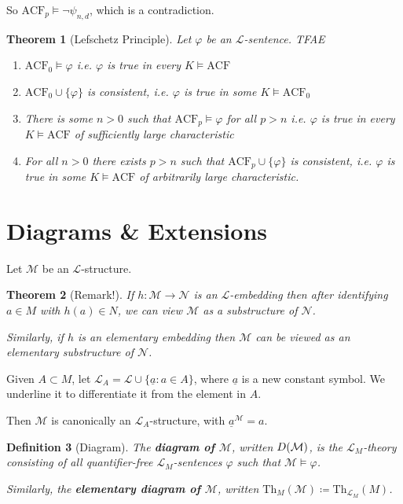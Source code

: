 \documentclass[]{article}
\theoremstyle{custhm}
\newtheorem{theorem}{Theorem}[section]
\theoremstyle{cusdef}
\newtheorem{defin}[theorem]{Definition}
\theoremstyle{custhm}
\theoremstyle{custhm}
\theoremstyle{custhm}
\theoremstyle{ex}
\theoremstyle{custhm}
\theoremstyle{cusdef}
\theoremstyle{remark}
\theoremstyle{remark}
\newcommand{\ra}{\rightarrow}
\newcommand{\undf}[1]{\textit{\textbf{#1}}}
\renewcommand{\L}{\mathcal{L}}
\renewcommand{\it}[1]{\textit{#1}}
\newcommand{\M}{\mathcal{M}}
\renewcommand{\phi}{\varphi}
\newcommand{\Th}{\textrm{Th}}
\newcommand{\N}{\mathcal{N}}
\newcommand{\acf}{\textrm{ACF}}
\newcommand{\D}{\mathcal{D}}
\begin{document}
So $\acf_p\models \neg\psi_{n,d}$, which is a contradiction.
\begin{theorem}[Lefschetz Principle]
Let $\phi$ be an $\L$-sentence. TFAE
\begin{enumerate}[label=(\arabic*)]
	\item $\acf_0\models \phi$ {\it i.e.} $\phi$ is true in every $K\models \acf$
	\item $\acf_0\cup\{\phi\}$ is consistent, {\it i.e.} $\phi$ is true in some $K\models \acf_0$
	\item There is some $n > 0$ such that $\acf_p\models\phi$ for all $p > n$ {\it i.e.} $\phi$ is true in every $K\models \acf$ of sufficiently large characteristic
	\item For all $n > 0$ there exists $p > n$ such that $\acf_p\cup\{\phi\}$ is consistent, {\it i.e.} $\phi$ is true in some $K\models \acf$ of arbitrarily large characteristic.
\end{enumerate}
\end{theorem}


\section{Diagrams \& Extensions}

Let $\M$ be an $\L$-structure.

\begin{theorem}[Remark!]
If $h:\M\ra\N$ is an $\L$-embedding then after identifying $a\in M$ with $h(a) \in N$, we can view $\M$ as a substructure of $\N$.

Similarly, if $h$ is an elementary embedding then $\M$ can be viewed as an elementary substructure of $\N$.
\end{theorem}

Given $A\subset M$, let $\L_A = \L\cup\{\underline{a}:a\in A\}$, where $\underline{a}$ is a new constant symbol. We underline it to differentiate it from the element in $A$.

Then $\M$ is canonically an $\L_A$-structure, with $\underline{a}^\M = a$.

\begin{defin}[Diagram]
The \undf{diagram of $\M$}, written $\\D(\M)$, is the $\L_M$-theory consisting of all quantifier-free $\L_M$-sentences $\phi$ such that $\M\models \phi$.

Similarly, the \undf{elementary diagram of $\M$}, written $\Th_M(\M)\coloneqq \Th_{\L_M}(M)$.
\end{defin}
\end{document}

